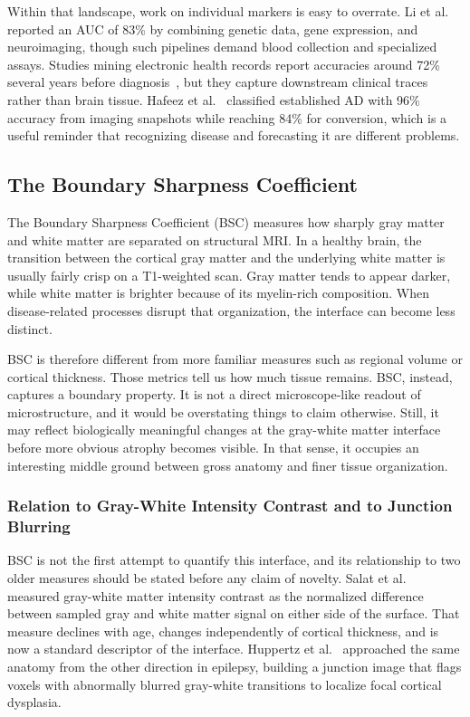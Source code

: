 \documentclass[blue]{ludusofficial}  %
\begin{document}
Within that landscape, work on individual markers is easy to overrate. Li et al.~\cite{li2021predicting} reported an AUC of 83\% by combining genetic data, gene expression, and neuroimaging, though such pipelines demand blood collection and specialized assays. Studies mining electronic health records report accuracies around 72\% several years before diagnosis~\cite{north2025breakthroughs}, but they capture downstream clinical traces rather than brain tissue. Hafeez et al.~\cite{hafeez2024deep} classified established AD with 96\% accuracy from imaging snapshots while reaching 84\% for conversion, which is a useful reminder that recognizing disease and forecasting it are different problems.

\subsection{The Boundary Sharpness Coefficient}

The Boundary Sharpness Coefficient (BSC) measures how sharply gray matter and white matter are separated on structural MRI. In a healthy brain, the transition between the cortical gray matter and the underlying white matter is usually fairly crisp on a T1-weighted scan. Gray matter tends to appear darker, while white matter is brighter because of its myelin-rich composition. When disease-related processes disrupt that organization, the interface can become less distinct.

BSC is therefore different from more familiar measures such as regional volume or cortical thickness. Those metrics tell us how much tissue remains. BSC, instead, captures a boundary property. It is not a direct microscope-like readout of microstructure, and it would be overstating things to claim otherwise. Still, it may reflect biologically meaningful changes at the gray-white matter interface before more obvious atrophy becomes visible. In that sense, it occupies an interesting middle ground between gross anatomy and finer tissue organization.

\subsubsection{Relation to Gray-White Intensity Contrast and to Junction Blurring}

BSC is not the first attempt to quantify this interface, and its relationship to two older measures should be stated before any claim of novelty. Salat et al.~\cite{salat2009age} measured gray-white matter intensity contrast as the normalized difference between sampled gray and white matter signal on either side of the surface. That measure declines with age, changes independently of cortical thickness, and is now a standard descriptor of the interface. Huppertz et al.~\cite{huppertz2005enhanced} approached the same anatomy from the other direction in epilepsy, building a junction image that flags voxels with abnormally blurred gray-white transitions to localize focal cortical dysplasia.
\end{document}
